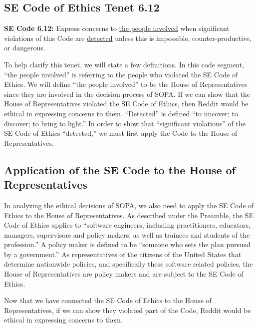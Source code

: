 \documentclass[11pt]{article}
\begin{document}
\begin{multicols}{2}

   \subsection{SE Code of Ethics Tenet 6.12}

\begin{framed}
\noindent
  \textbf{SE Code 6.12:}
  \newline
  Express concerns to \underline{the people involved} when significant violations of this Code are \underline{detected} unless this is impossible, counter-productive, or dangerous.\cite[6.12]{se-code}
\end{framed}

To help clarify this tenet, we will state a few definitions. In this code segment, ``the people involved'' is referring to the people who violated the SE Code of Ethics. We will define ``the people involved'' to be the House of Representatives since they are involved in the decision process of SOPA. If we can show that the House of Representatives violated the SE Code of Ethics, then Reddit would be ethical in expressing concerns to them. ``Detected'' is defined ``to uncover; to discover; to bring to light.''\cite{def-detected} In order to show that ``significant violations'' of the SE Code of Ethics ``detected,'' we must first apply the Code to the House of Representatives.

   \subsection{Application of the SE Code to the House of Representatives}

In analyzing the ethical decisions of SOPA, we also need to apply the SE Code of Ethics to the House of Representatives. As described under the Preamble, the SE Code of Ethics applies to ``software engineers, including practitioners, educators, managers, supervisors and policy makers, as well as trainees and students of the profession.''\cite{se-code} A policy maker is defined to be ``someone who sets the plan pursued by a government.''\cite{def-policy-maker} As representatives of the citizens of the United States that determine nationwide policies, and specifically these software related policies, the House of Representatives are policy makers and are subject to the SE Code of Ethics.

Now that we have connected the SE Code of Ethics to the House of Representatives, if we can show they violated part of the Code, Reddit would be ethical in expressing concerns to them.


\end{multicols}
\end{document}
